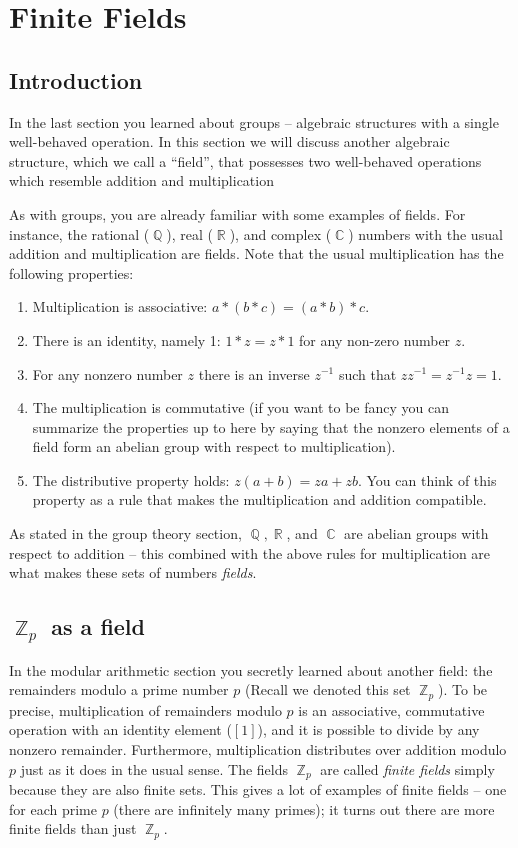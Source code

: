 \documentclass[12 pt]{article}
\DeclareMathOperator{\R}{\mathbb{R}}
\DeclareMathOperator{\C}{\mathbb{C}}
\DeclareMathOperator{\Z}{\mathbb{Z}}
\DeclareMathOperator{\Q}{\mathbb{Q}}
\begin{document}
\newpage
\section{Finite Fields}

\subsection{Introduction}
In the last section you learned about groups -- algebraic structures with a single well-behaved operation. In this section we will discuss another algebraic structure, which we call a ``field'', that possesses two well-behaved operations which resemble addition and multiplication

As with groups, you are already familiar with some examples of fields. For instance, the rational ($\Q$), real ($\R$), and complex ($\C$) numbers with the usual addition and multiplication are fields. Note that the usual multiplication has the following properties:
\begin{enumerate}[label=(\roman*)]
\item Multiplication is associative: $a*(b*c)=(a*b)*c$.
\item There is an identity, namely 1: $1*z=z*1$ for any non-zero number $z$. 
\item For any nonzero number $z$ there is an inverse $z^{-1}$ such that $zz^{-1}=z^{-1}z=1$.
\item The multiplication is commutative (if you want to be fancy you can summarize the properties up to here by saying that the nonzero elements of a field form an abelian group with respect to multiplication).
\item The distributive property holds: $z(a+b)=za+zb$. You can think of this property as a rule that makes the multiplication and addition compatible.
\end{enumerate}
As stated in the group theory section, $\Q,\R$, and $\C$ are abelian groups with respect to addition -- this combined with the above rules for multiplication are what makes these sets of numbers \emph{fields}.


\subsection{$\Z_p$ as a field}
In the modular arithmetic section you secretly learned about another field: the remainders modulo a prime number $p$ (Recall we denoted this set $\Z_p$). To be precise, multiplication of remainders modulo $p$ is an associative, commutative operation with an identity element ($[1]$), and it is possible to divide by any nonzero remainder. Furthermore, multiplication distributes over addition modulo $p$ just as it does in the usual sense. The fields $\Z_p$ are called \emph{finite fields} simply because they are also finite sets. This gives a lot of examples of finite fields -- one for each prime $p$ (there are infinitely many primes); it turns out there are more finite fields than just $\Z_p$.
\end{document}
